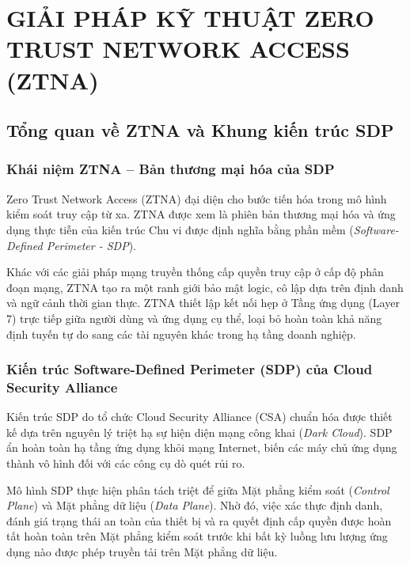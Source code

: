\chapter{GIẢI PHÁP KỸ THUẬT ZERO TRUST NETWORK ACCESS (ZTNA)}
\label{chap:chuong_3}

\section{Tổng quan về ZTNA và Khung kiến trúc SDP}
\label{sec:3_1}

\subsection{Khái niệm ZTNA -- Bản thương mại hóa của SDP}
\label{subsec:3_1_1}

Zero Trust Network Access (ZTNA) đại diện cho bước tiến hóa trong mô hình kiểm soát truy cập từ xa. ZTNA được xem là phiên bản thương mại hóa và ứng dụng thực tiễn của kiến trúc Chu vi được định nghĩa bằng phần mềm (\textit{Software-Defined Perimeter - SDP}). 

Khác với các giải pháp mạng truyền thống cấp quyền truy cập ở cấp độ phân đoạn mạng, ZTNA tạo ra một ranh giới bảo mật logic, cô lập dựa trên định danh và ngữ cảnh thời gian thực. ZTNA thiết lập kết nối hẹp ở Tầng ứng dụng (Layer 7) trực tiếp giữa người dùng và ứng dụng cụ thể, loại bỏ hoàn toàn khả năng định tuyến tự do sang các tài nguyên khác trong hạ tầng doanh nghiệp.

\subsection{Kiến trúc Software-Defined Perimeter (SDP) của Cloud Security Alliance}
\label{subsec:3_1_2}

Kiến trúc SDP do tổ chức Cloud Security Alliance (CSA) chuẩn hóa được thiết kế dựa trên nguyên lý triệt hạ sự hiện diện mạng công khai (\textit{Dark Cloud}). SDP ẩn hoàn toàn hạ tầng ứng dụng khỏi mạng Internet, biến các máy chủ ứng dụng thành vô hình đối với các công cụ dò quét rủi ro. 

Mô hình SDP thực hiện phân tách triệt để giữa Mặt phẳng kiểm soát (\textit{Control Plane}) và Mặt phẳng dữ liệu (\textit{Data Plane}). Nhờ đó, việc xác thực định danh, đánh giá trạng thái an toàn của thiết bị và ra quyết định cấp quyền được hoàn tất hoàn toàn trên Mặt phẳng kiểm soát trước khi bất kỳ luồng lưu lượng ứng dụng nào được phép truyền tải trên Mặt phẳng dữ liệu.

